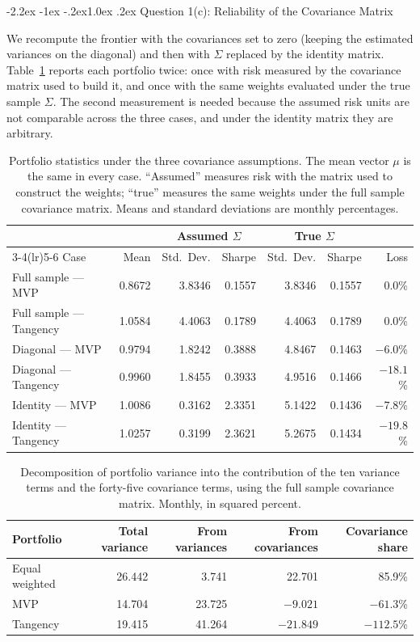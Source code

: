 \documentclass[11pt]{article}
\makeatletter
\renewcommand\subsection{\@startsection{subsection}{2}{0pt}%
  {-2.2ex \@plus -1ex \@minus -.2ex}{1.0ex \@plus .2ex}%
  {\normalfont\bfseries\normalsize\color{psink}}}
\makeatother
\begin{document}
\subsection{Question 1(c): Reliability of the Covariance Matrix}

We recompute the frontier with the covariances set to zero (keeping the
estimated variances on the diagonal) and then with $\Sigma$ replaced by the
identity matrix. Table~\ref{tab:q1c} reports each portfolio twice: once with
risk measured by the covariance matrix used to build it, and once with the
same weights evaluated under the true sample $\Sigma$. The second measurement
is needed because the assumed risk units are not comparable across the three
cases, and under the identity matrix they are arbitrary.

\begin{table}[H]
\centering
\caption{Portfolio statistics under the three covariance assumptions. The mean
vector $\mu$ is the same in every case. ``Assumed'' measures risk with the
matrix used to construct the weights; ``true'' measures the same weights under
the full sample covariance matrix. Means and standard deviations are monthly
percentages.}
\small
\begin{tabular}{lrrrrrr}
\toprule
 & & \multicolumn{2}{c}{Assumed $\Sigma$} & \multicolumn{2}{c}{True $\Sigma$} & \\
\cmidrule(lr){3-4}\cmidrule(lr){5-6}
Case & Mean & Std.\ Dev. & Sharpe & Std.\ Dev. & Sharpe & Loss \\
\midrule
Full sample --- MVP & 0.8672 & 3.8346 & 0.1557 & 3.8346 & 0.1557 & 0.0\% \\
Full sample --- Tangency & 1.0584 & 4.4063 & 0.1789 & 4.4063 & 0.1789 & 0.0\% \\
Diagonal --- MVP & 0.9794 & 1.8242 & 0.3888 & 4.8467 & 0.1463 & $-6.0$\% \\
Diagonal --- Tangency & 0.9960 & 1.8455 & 0.3933 & 4.9516 & 0.1466 & $-18.1$\% \\
Identity --- MVP & 1.0086 & 0.3162 & 2.3351 & 5.1422 & 0.1436 & $-7.8$\% \\
Identity --- Tangency & 1.0257 & 0.3199 & 2.3621 & 5.2675 & 0.1434 & $-19.8$\% \\
\bottomrule
\end{tabular}
\label{tab:q1c}
\end{table}

\begin{table}[H]
\centering
\caption{Decomposition of portfolio variance into the contribution of the ten
variance terms and the forty-five covariance terms, using the full sample
covariance matrix. Monthly, in squared percent.}
\small
\begin{tabular}{lrrrr}
\toprule
Portfolio & Total variance & From variances & From covariances & Covariance share \\
\midrule
Equal weighted & 26.442 & 3.741 & 22.701 & 85.9\% \\
MVP & 14.704 & 23.725 & $-9.021$ & $-61.3$\% \\
Tangency & 19.415 & 41.264 & $-21.849$ & $-112.5$\% \\
\bottomrule
\end{tabular}
\label{tab:q1c_decomp}
\end{table}
\end{document}
